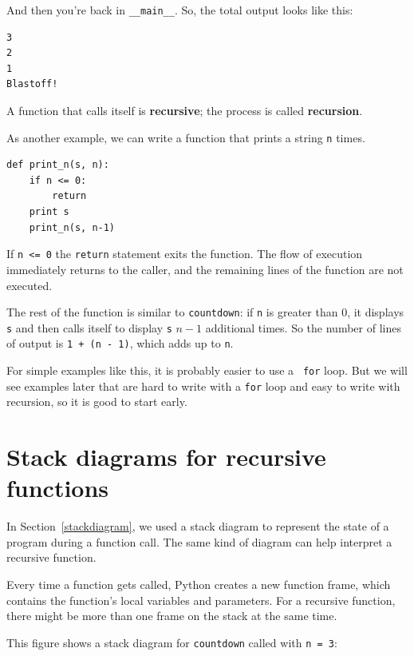 \documentclass[10pt]{book}
\begin{document}
And then you're back in \verb"__main__".  So, the
total output looks like this:

\beforeverb
\begin{verbatim}
3
2
1
Blastoff!
\end{verbatim}
\afterverb
%
A function that calls itself is {\bf recursive}; the process is
called {\bf recursion}.


As another example, we can write a function that prints a
string {\tt n} times.

\beforeverb
\begin{verbatim}
def print_n(s, n):
    if n <= 0:
        return
    print s
    print_n(s, n-1)
\end{verbatim}
\afterverb
%
If {\tt n <= 0} the {\tt return} statement exits the function.  The
flow of execution immediately returns to the caller, and the remaining
lines of the function are not executed.


The rest of the function is similar to {\tt countdown}: if {\tt n} is
greater than 0, it displays {\tt s} and then calls itself to display
{\tt s} $n-1$ additional times.  So the number of lines of output
is {\tt 1 + (n - 1)}, which adds up to
{\tt n}.

For simple examples like this, it is probably easier to use a {\tt
for} loop.  But we will see examples later that are hard to write
with a {\tt for} loop and easy to write with recursion, so it is
good to start early.



\section{Stack diagrams for recursive functions}

In Section~\ref{stackdiagram}, we used a stack diagram to represent
the state of a program during a function call.  The same kind of
diagram can help interpret a recursive function.

Every time a function gets called, Python creates a new function
frame, which contains the function's local variables and parameters.
For a recursive function, there might be more than one frame on the
stack at the same time.

This figure shows a stack diagram for {\tt countdown} called with
{\tt n = 3}:
\end{document}
